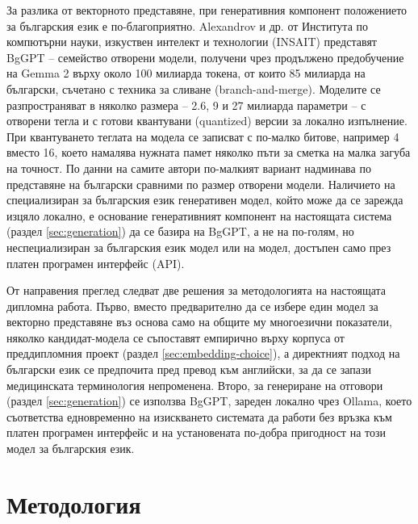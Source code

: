 \documentclass[12pt,a4paper]{article}
\let\origsection\section
\renewcommand{\section}{\clearpage\origsection}
\begin{document}
За разлика от векторното представяне, при генеративния компонент положението за българския език е по-благоприятно. Alexandrov и др. \cite{alexandrov2024bggpt} от Института по компютърни науки, изкуствен интелект и технологии (INSAIT) представят BgGPT -- семейство отворени модели, получени чрез продължено предобучение на Gemma 2 върху около 100 милиарда токена, от които 85 милиарда на български, съчетано с техника за сливане (branch-and-merge). Моделите се разпространяват в няколко размера -- 2.6, 9 и 27 милиарда параметри -- с отворени тегла и с готови квантувани (quantized) версии за локално изпълнение. При квантуването теглата на модела се записват с по-малко битове, например 4 вместо 16, което намалява нужната памет няколко пъти за сметка на малка загуба на точност. По данни на самите автори по-малкият вариант надминава по представяне на български сравними по размер отворени модели. Наличието на специализиран за българския език генеративен модел, който може да се зарежда изцяло локално, е основание генеративният компонент на настоящата система (раздел \ref{sec:generation}) да се базира на BgGPT, а не на по-голям, но неспециализиран за българския език модел или на модел, достъпен само през платен програмен интерфейс (API).

От направения преглед следват две решения за методологията на настоящата дипломна работа. Първо, вместо предварително да се избере един модел за векторно представяне въз основа само на общите му многоезични показатели, няколко кандидат-модела се съпоставят емпирично върху корпуса от преддипломния проект (раздел \ref{sec:embedding-choice}), а директният подход на български език се предпочита пред превод към английски, за да се запази медицинската терминология непроменена. Второ, за генериране на отговори (раздел \ref{sec:generation}) се използва BgGPT, зареден локално чрез Ollama, което съответства едновременно на изискването системата да работи без връзка към платен програмен интерфейс и на установената по-добра пригодност на този модел за българския език.

\section{Методология}
\end{document}
